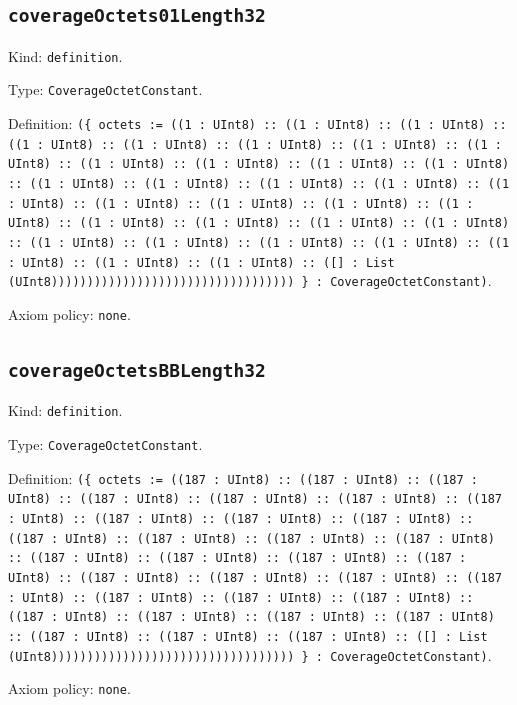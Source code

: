\documentclass[11pt]{article}
\begin{document}
\subsection*{\texttt{coverageOctets01Length32}}
\noindent Kind: \texttt{definition}.\par
\noindent Type: \texttt{CoverageOctetConstant}.\par
\noindent Definition: \texttt{(\{ octets := ((1 : UInt8) :: ((1 : UInt8) :: ((1 : UInt8) :: ((1 : UInt8) :: ((1 : UInt8) :: ((1 : UInt8) :: ((1 : UInt8) :: ((1 : UInt8) :: ((1 : UInt8) :: ((1 : UInt8) :: ((1 : UInt8) :: ((1 : UInt8) :: ((1 : UInt8) :: ((1 : UInt8) :: ((1 : UInt8) :: ((1 : UInt8) :: ((1 : UInt8) :: ((1 : UInt8) :: ((1 : UInt8) :: ((1 : UInt8) :: ((1 : UInt8) :: ((1 : UInt8) :: ((1 : UInt8) :: ((1 : UInt8) :: ((1 : UInt8) :: ((1 : UInt8) :: ((1 : UInt8) :: ((1 : UInt8) :: ((1 : UInt8) :: ((1 : UInt8) :: ((1 : UInt8) :: ((1 : UInt8) :: ([] : List (UInt8)))))))))))))))))))))))))))))))))) \} : CoverageOctetConstant)}.\par
\noindent Axiom policy: \texttt{none}.\par
\subsection*{\texttt{coverageOctetsBBLength32}}
\noindent Kind: \texttt{definition}.\par
\noindent Type: \texttt{CoverageOctetConstant}.\par
\noindent Definition: \texttt{(\{ octets := ((187 : UInt8) :: ((187 : UInt8) :: ((187 : UInt8) :: ((187 : UInt8) :: ((187 : UInt8) :: ((187 : UInt8) :: ((187 : UInt8) :: ((187 : UInt8) :: ((187 : UInt8) :: ((187 : UInt8) :: ((187 : UInt8) :: ((187 : UInt8) :: ((187 : UInt8) :: ((187 : UInt8) :: ((187 : UInt8) :: ((187 : UInt8) :: ((187 : UInt8) :: ((187 : UInt8) :: ((187 : UInt8) :: ((187 : UInt8) :: ((187 : UInt8) :: ((187 : UInt8) :: ((187 : UInt8) :: ((187 : UInt8) :: ((187 : UInt8) :: ((187 : UInt8) :: ((187 : UInt8) :: ((187 : UInt8) :: ((187 : UInt8) :: ((187 : UInt8) :: ((187 : UInt8) :: ((187 : UInt8) :: ([] : List (UInt8)))))))))))))))))))))))))))))))))) \} : CoverageOctetConstant)}.\par
\noindent Axiom policy: \texttt{none}.\par
\end{document}
